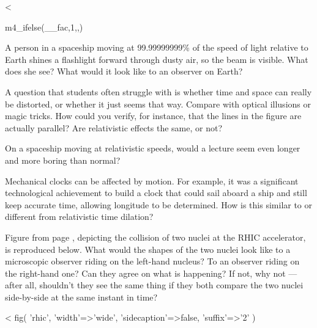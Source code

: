   <%

m4_ifelse(__fac,1,,\vfill)


\startdqs
\begin{dq}
A person in a spaceship moving at 99.99999999\% of the
speed of light relative to Earth shines a flashlight forward
through dusty air, so the beam is visible. What does she
see? What would it look like to an observer on Earth?
\end{dq}

\vspace{m4_ifelse(__me,1,5,0)mm}

\begin{dq}\label{dq:illusion}
A question that students often struggle with is whether
time and space can really be distorted, or whether it just
seems that way. Compare with optical illusions or magic
tricks. How could you verify, for instance, that the lines
in the figure are actually parallel? Are relativistic
effects the same, or not?
\end{dq}

\vspace{m4_ifelse(__me,1,5,0)mm}

\begin{dq}
On a spaceship moving at relativistic speeds, would a
lecture seem even longer and more boring than normal?
\end{dq}

\vspace{m4_ifelse(__me,1,5,0)mm}

\begin{dq}
Mechanical clocks can be affected by motion. For example,
it was a significant technological achievement to build a
clock that could sail aboard a ship and still keep accurate
time, allowing longitude to be determined. How is this
similar to or different from relativistic time dilation?
\end{dq}

\begin{dq}\label{dq:rhic}
Figure  from page \pageref{fig:rhic}, depicting the collision of
two nuclei at the RHIC accelerator, is reproduced below.
What would the shapes of the two nuclei
look like to a microscopic observer riding on the
left-hand nucleus? To an observer riding on the right-hand
one? Can they agree on what is happening? If not, why not
--- after all, shouldn't they see the same thing if they
both compare the two nuclei side-by-side at the same instant in time?
\end{dq}
<%
  fig(
    'rhic',
    {
      'width'=>'wide',
      'sidecaption'=>false,
      'suffix'=>'2'
    }
  )

